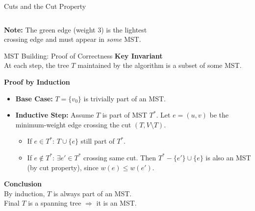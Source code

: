 \documentclass{beamer}
\begin{document}
\begin{frame}{Cuts and the Cut Property}
\begin{columns}[T]
\end{columns}

\textcolor{new_turquoise}{\bf Note:} The green edge (weight 3) is the lightest \\ crossing edge and must appear in \emph{some} MST.
\end{frame}






\begin{frame}{MST Building: Proof of Correctness}
\textcolor{new_turquoise}{\bf Key Invariant}\\
At each step, the tree $T$ maintained by the algorithm is a subset of some MST.


\textcolor{new_turquoise}{\bf Proof by Induction}
\begin{itemize}
\item \textbf{Base Case:} $T = \{v_0\}$ is trivially part of an MST.
\item \textbf{Inductive Step:} Assume $T$ is part of MST $T^*$. Let $e = (u,v)$ be the minimum-weight edge crossing the cut $(T, V \setminus T)$.
\begin{itemize}
\item If $e \in T^*$: $T \cup \{e\}$ still part of $T^*$.
\item If $e \notin T^*$: $\exists e' \in T^*$ crossing same cut. Then $T^* - \{e'\} \cup \{e\}$ is also an MST (by cut property), since $w(e) \leq w(e')$.
\end{itemize}
\end{itemize}

\textcolor{new_turquoise}{\bf Conclusion}\\
By induction, $T$ is always part of an MST. \\ Final $T$ is a spanning tree $\Rightarrow$ it is an MST.
\end{frame}
\end{document}
